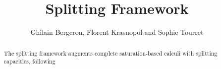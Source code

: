 \documentclass[11pt,a4paper]{article}
\begin{document}
\title{Splitting Framework}
\author{Ghilain Bergeron, Florent Krasnopol and Sophie Tourret}
\maketitle

\begin{abstract}
  The splitting framework augments complete saturation-based calculi with splitting capacities, following \cite{dblp:journals/jar/ebnerbt23}
\end{abstract}

\tableofcontents





\end{document}

